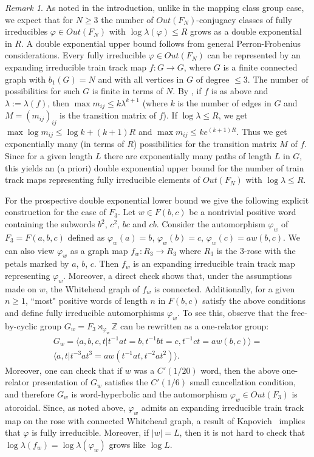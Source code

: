\documentclass[11pt,letterpaper]{amsart}
\theoremstyle{definition}
\theoremstyle{remark}
\newtheorem{rem}[thm]{Remark}
\renewcommand{\phi}{\varphi}
\begin{document}
\begin{rem}\label{rem:exp}
As noted in the introduction, unlike in the mapping class group case, we expect that for $N\ge 3$ the number of $Out(F_N)$-conjugacy classes of fully irreducibles $\phi\in Out(F_N)$ with $\log\lambda(\phi)\le R$ grows as a double exponential in $R$. A double exponential upper bound follows from general Perron-Frobenius considerations. Every fully irreducible $\phi\in Out(F_N)$ can be represented by an expanding irreducible train track map $f:G\to G$, where $G$ is a finite connected graph with $b_1(G)=N$ and with all vertices in $G$ of degree $\le 3$. The number of possibilities for such $G$ is finite in terms of $N$. By \cite[Proposition~A.4]{KB}, if $f$ is as above and $\lambda:=\lambda(f)$, then 
$\max m_{ij}\le k \lambda^{k+1}$ (where $k$ is the number of edges in $G$ and $M=(m_{ij})_{ij}$ is the transition matrix of $f$). If $\log \lambda\le R$, we get $\max \log m_{ij} \le \log k + (k+1) R$ and $\max m_{ij}\le k e^{(k+1)R}$. Thus we get exponentially many (in terms of $R$) possibilities for the transition matrix $M$ of $f$. Since for a given length $L$ there are exponentially many paths of length $L$ in $G$, this yields an (a priori) double exponential upper bound for the number of train track maps representing fully irreducible elements of $Out(F_N)$ with $\log\lambda \le R$.

For the prospective double exponential lower bound we give the following explicit construction for the case of $F_3$.  Let $w\in F(b,c)$ be a nontrivial positive word containing the subwords $b^2$, $c^2$, $bc$ and $cb$.  Consider the automorphism $\phi_w$ of $F_3=F(a,b,c)$ defined as $\phi_w(a)=b$, $\phi_w(b)=c$, $\phi_w(c)=aw(b,c)$. We can also view $\phi_w$ as a graph map $f_w:R_3\to R_3$ where $R_3$ is the $3$-rose with the petals marked by $a$, $b$, $c$.  Then $f_w$ is an expanding irreducible train track map representing $\phi_w$. Moreover, a direct check shows that, under the assumptions made on $w$, the Whitehead graph of $f_w$ is connected. Additionally, for a given $n\ge 1$, ``most" positive words of length $n$ in $F(b,c)$ satisfy the above conditions and define fully irreducible automorphisms $\phi_w$. To see this, observe that the free-by-cyclic group $G_{w}=F_3\rtimes_{\phi_w} \mathbb Z$ can be rewritten as a one-relator group:
\begin{gather*}
G_w=\langle a,b,c,t| t^{-1}at=b, t^{-1}bt=c, t^{-1}ct=aw(b,c)\rangle=\\
\langle a, t | t^{-3}at^3=aw(t^{-1}at, t^{-2}at^2)\rangle.
\end{gather*}
Moreover, one can check that if $w$ was a $C'(1/20)$ word, then the above one-relator presentation of $G_w$ satisfies the $C'(1/6)$ small cancellation condition, and therefore $G_w$ is word-hyperbolic and the automorphism $\phi_w\in Out(F_3)$ is atoroidal. Since, as noted above, $\phi_w$ admits an expanding irreducible train track map on the rose with connected Whitehead graph, a result of Kapovich~\cite{Ka} implies that $\phi$ is fully irreducible. Moreover, if $|w|=L$, then it is not hard to check that  $\log \lambda(f_w)=\log\lambda(\phi_w)$ grows like $\log L$.


\end{rem}
\end{document}

